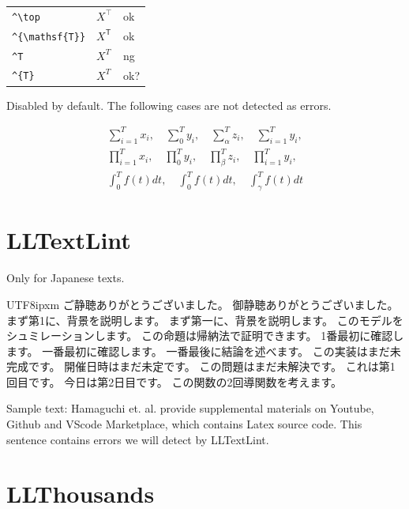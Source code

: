 \documentclass[a4paper]{article}
\newcommand{\tA}[1]{\textcolor{cA}{#1}}
\newcommand{\tC}[1]{\textcolor{cC}{#1}}
\newcommand{\tD}[1]{\textcolor{cD}{#1}}
\begin{document}
\begin{table}[H]
	\centering
	\begin{tabular}{lll}
		\verb|^\top|         & $X^\top$         & \tA{ok}  \\
		\verb|^{\mathsf{T}}| & $X^{\mathsf{T}}$ & \tA{ok}  \\
		\verb|^T|            & $X^T$            & \tD{ng}  \\
		\verb|^{T}|          & $X^{T}$          & \tC{ok?} \\
	\end{tabular}
\end{table}

Disabled by default.
The following cases are not detected as errors.

\begin{gather*}
	\sum^T_{i=1} x_i, \quad \sum_0^T y_i, \quad \sum_\alpha^T z_i, \quad \sum_{i=1}^T y_i,    \\
	\prod^T_{i=1} x_i, \quad \prod_0^T y_i, \quad \prod_\beta^T z_i, \quad \prod_{i=1}^T y_i, \\
	\int^T_0 f(t) dt, \quad \int_0^T f(t) dt, \quad \int_\gamma^T f(t) dt
\end{gather*}

\section{LLTextLint}

Only for Japanese texts.

\begin{CJK}{UTF8}{ipxm}
	ご静聴ありがとうございました。
	御静聴ありがとうございました。
	まず第1に、背景を説明します。
	まず第一に、背景を説明します。
	このモデルをシュミレーションします。
	この命題は帰納法で証明できます。
	1番最初に確認します。
	一番最初に確認します。
	一番最後に結論を述べます。
	この実装はまだ未完成です。
	開催日時はまだ未定です。
	この問題はまだ未解決です。
	これは第1回目です。
	今日は第2日目です。
	この関数の2回導関数を考えます。
\end{CJK}

Sample text: Hamaguchi et. al. provide supplemental materials on Youtube, Github and VScode Marketplace, which contains Latex source code. This sentence contains errors we will detect by LLTextLint.

\section{LLThousands}
\end{document}
